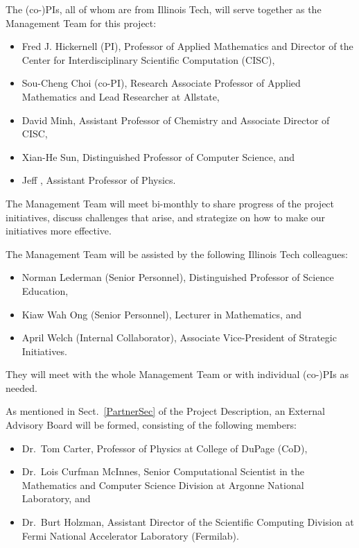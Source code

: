\documentclass[11pt]{NSFamsart}
\begin{document}
The (co-)PIs, all of whom are from Illinois Tech, will serve together as the Management Team for this project:
\begin{itemize}
\item Fred J. Hickernell (PI), Professor of Applied Mathematics and Director of the Center for Interdisciplinary Scientific Computation (CISC), 
\item Sou-Cheng Choi (co-PI), Research Associate Professor of Applied Mathematics and Lead Researcher at Allstate,
\item David Minh, Assistant Professor of Chemistry and Associate Director of CISC,
\item Xian-He Sun, Distinguished Professor of Computer Science, and 
\item Jeff \JW, Assistant Professor of Physics. 
\end{itemize}
The Management Team will meet bi-monthly to share progress of the project initiatives, discuss challenges that arise, and strategize on how to make our initiatives more effective.

The Management Team will be assisted by the following Illinois Tech colleagues:
\begin{itemize}
\item Norman Lederman (Senior Personnel), Distinguished Professor of Science Education,
\item Kiaw Wah Ong  (Senior Personnel), Lecturer in Mathematics, and 
\item April Welch (Internal Collaborator), Associate Vice-President of Strategic Initiatives. \end{itemize}
They will meet with the whole Management Team or with individual (co-)PIs as needed.

As mentioned in Sect.\ \ref{PartnerSec} of the Project Description, an External Advisory Board will be formed, consisting of the following members:
\begin{itemize}
\item Dr.~Tom Carter, Professor of Physics at College of DuPage (CoD),

\item Dr.~Lois Curfman McInnes, Senior Computational Scientist in the Mathematics and Computer Science Division at Argonne National Laboratory, and

\item Dr.~Burt Holzman, Assistant Director of the Scientific Computing
Division at Fermi National Accelerator Laboratory (Fermilab).

\end{itemize}
\end{document}
